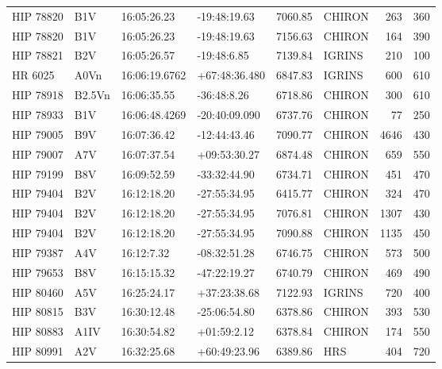 \documentclass{emulateapj}
\begin{document}
\begin{longtable*}{|l|lllrlrr|}
   HIP 78820 &            B1V &    16:05:26.23 &   -19:48:19.63 &  7060.85 &     CHIRON &      263 &     360 \\
   HIP 78820 &            B1V &    16:05:26.23 &   -19:48:19.63 &  7156.63 &     CHIRON &      164 &     390 \\
   HIP 78821 &            B2V &    16:05:26.57 &    -19:48:6.85 &  7139.84 &     IGRINS &      210 &     100 \\
     HR 6025 &           A0Vn &  16:06:19.6762 &  +67:48:36.480 &  6847.83 &     IGRINS &      600 &     610 \\
   HIP 78918 &         B2.5Vn &    16:06:35.55 &    -36:48:8.26 &  6718.86 &     CHIRON &      300 &     610 \\
   HIP 78933 &            B1V &  16:06:48.4269 &  -20:40:09.090 &  6737.76 &     CHIRON &       77 &     250 \\
   HIP 79005 &            B9V &    16:07:36.42 &   -12:44:43.46 &  7090.77 &     CHIRON &     4646 &     430 \\
   HIP 79007 &            A7V &    16:07:37.54 &   +09:53:30.27 &  6874.48 &     CHIRON &      659 &     550 \\
   HIP 79199 &            B8V &    16:09:52.59 &   -33:32:44.90 &  6734.71 &     CHIRON &      451 &     470 \\
   HIP 79404 &            B2V &    16:12:18.20 &   -27:55:34.95 &  6415.77 &     CHIRON &      324 &     470 \\
   HIP 79404 &            B2V &    16:12:18.20 &   -27:55:34.95 &  7076.81 &     CHIRON &     1307 &     430 \\
   HIP 79404 &            B2V &    16:12:18.20 &   -27:55:34.95 &  7090.88 &     CHIRON &     1135 &     450 \\
   HIP 79387 &            A4V &     16:12:7.32 &   -08:32:51.28 &  6746.75 &     CHIRON &      573 &     500 \\
   HIP 79653 &            B8V &    16:15:15.32 &   -47:22:19.27 &  6740.79 &     CHIRON &      469 &     490 \\
   HIP 80460 &            A5V &    16:25:24.17 &   +37:23:38.68 &  7122.93 &     IGRINS &      720 &     400 \\
   HIP 80815 &            B3V &    16:30:12.48 &   -25:06:54.80 &  6378.86 &     CHIRON &      393 &     530 \\
   HIP 80883 &           A1IV &    16:30:54.82 &    +01:59:2.12 &  6378.84 &     CHIRON &      174 &     550 \\
   HIP 80991 &            A2V &    16:32:25.68 &   +60:49:23.96 &  6389.86 &        HRS &      404 &     720 \\

\end{longtable*}
\end{document}
